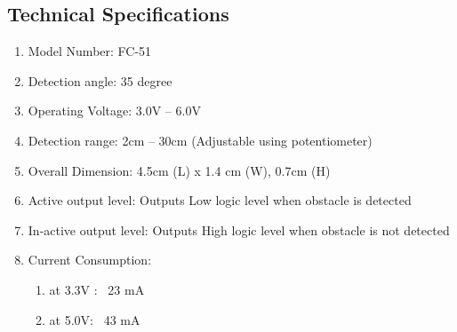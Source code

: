  \subsection*{Technical Specifications}
\begin{enumerate}
\item  Model Number: FC-51 
\item Detection angle: 35 degree
\item Operating Voltage: 3.0V – 6.0V 
\item Detection range: 2cm – 30cm (Adjustable using potentiometer) 
\item  Overall Dimension: 4.5cm (L) x 1.4 cm (W), 0.7cm (H) 
\item Active output level: Outputs Low logic level when obstacle is detected 
\item In-active output level: Outputs High logic level when obstacle is not detected 
\item Current Consumption: 
\begin{enumerate}
\item at 3.3V : ~23 mA 
	\item at 5.0V: ~43 mA 
\end{enumerate}	
\end{enumerate}
